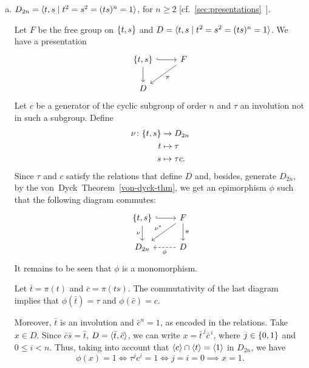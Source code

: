 \begin{xmpl}
\begin{enumerate}[a),font=\upshape]
        The other involutions are
        $$
            (c,0)(0,1) = (c,1),
        $$
        which are exactly the elements of $\Z_n\rtimes\Z_2\setminus D$, where $D=\im(\iota_{\Z_n})$ is the image of $\Z_n$ in $\Z_n\rtimes\Z_2$.
        
        \item $D_{2n}=\langle t,s\mid t^2=s^2= (ts)^n = 1\rangle$, for $n\ge2$ [cf.~\ref{sec:presentations}~].

        Let $F$ be the free group on $\{t,s\}$ and $D=\langle t,s\mid t^2=s^2= (ts)^n = 1\rangle$. We have a presentation
        $$
            \begin{tikzcd}
                \set{t,s}
                        \arrow[d]
                        \arrow[r,hook]
                    &F
                        \arrow[ld,"\pi"]\\
                D
            \end{tikzcd}
        $$
        Let $c$ be a generator of the cyclic subgroup of order $n$ and $\tau$ an involution not in such a subgroup. Define
        \begin{align*}
            \nu\colon\{t,s\}&\to D_{2n}\\
            t&\mapsto\tau\\
            s&\mapsto\tau c.
        \end{align*}
        Since $\tau$ and $c$ satisfy the relations that define $D$ and, besides, generate $D_{2n}$, by the von~Dyck~Theorem~\ref{von-dyck-thm}, we get an epimorphism $\phi$ such that the following diagram commutes:
        $$
            \begin{tikzcd}
                {\set{t,s}}
                        \arrow[r,hook]
                        \arrow[d,"\nu"']
                    &F
                        \arrow[d,"\pi"]
                        \arrow[ld,"\nu^*"']\\
                D_{2n}
                    &D
                        \arrow[l,"\phi",dashed]
            \end{tikzcd}
        $$
        It remains to be seen that $\phi$ is a monomorphism.

        Let $\bar t=\pi(t)$ and $\bar c=\pi(ts)$. The commutativity of the last diagram implies that $\phi(\bar t)=\tau$ and $\phi(\bar c)=c$.
        
        Moreover, $\bar t$ is an involution and $\bar c^n=1$, as encoded in the relations. Take $x\in D$. Since $\bar c\bar s=\bar t$, $D=\langle\bar t,\bar c\rangle$, we can write $x=\bar t^{\,j}\bar c^{\,i}$, where $j\in\{0,1\}$ and $0\le i<n$. Thus, taking into account that $\langle c\rangle\cap\langle t\rangle=\langle1\rangle$ in $D_{2n}$, we have
        $$
            \phi(x)=1 \iff \tau^j c^i=1
                \iff j=i=0 \implies x=1.
        $$
    \end{enumerate}
\end{xmpl}

